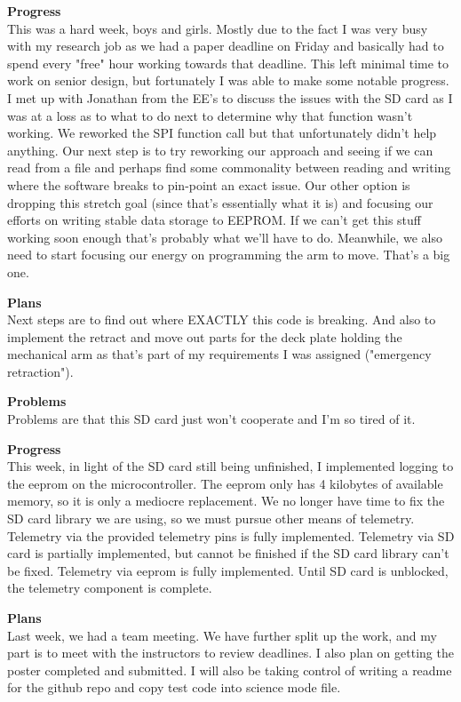 \textbf{Progress} \\ 
This was a hard week, boys and girls. Mostly due to the fact I was very busy with my research job as we had a paper deadline on Friday and basically had 
to spend every "free" hour working towards that deadline. This left minimal time to work on senior design, but fortunately I was able to make some 
notable progress. I met up with Jonathan from the EE's to discuss the issues with the SD card as I was at a loss as to what to do next to determine why 
that function wasn't working. We reworked the SPI function call but that unfortunately didn't help anything. Our next step is to try reworking our 
approach and seeing if we can read from a file and perhaps find some commonality between reading and writing where the software breaks to pin-point an 
exact issue. Our other option is dropping this stretch goal (since that's essentially what it is) and focusing our efforts on writing stable data storage 
to EEPROM. If we can't get this stuff working soon enough that's probably what we'll have to do. Meanwhile, we also need to start focusing our energy on 
programming the arm to move. That's a big one.

\textbf{Plans} \\ 
Next steps are to find out where EXACTLY this code is breaking. And also to implement the retract and move out parts for the deck plate holding the 
mechanical arm as that's part of my requirements I was assigned ("emergency retraction").

\textbf{Problems} \\
Problems are that this SD card just won't cooperate and I'm so tired of it.

\textbf{Progress} \\
This week, in light of the SD card still being unfinished, I implemented logging to the eeprom on the microcontroller. The eeprom only has 4 kilobytes of available memory, so it is only a mediocre replacement. We no longer have time to fix the SD card library we are using, so we must pursue other means of telemetry. Telemetry via the provided telemetry pins is fully implemented. Telemetry via SD card is partially implemented, but cannot be finished if the SD card library can't be fixed. Telemetry via eeprom is fully implemented. Until SD card is unblocked, the telemetry component is complete.

\textbf{Plans} \\
Last week, we had a team meeting. We have further split up the work, and my part is to meet with the instructors to review deadlines. I also plan on getting the poster completed and submitted. I will also be taking control of writing a readme for the github repo and copy test code into science mode file.

